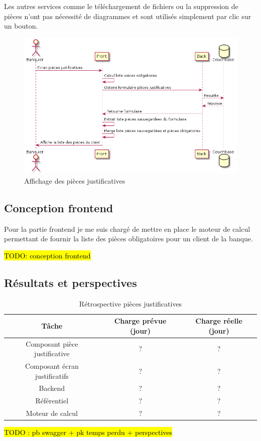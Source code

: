 	Les autres services comme le téléchargement de fichiers ou la suppression de pièces n'ont pas nécessité de diagrammes et sont utilisés simplement par clic sur un bouton. \\

\begin{figure}[h!]
	\includegraphics[scale=0.55]{images/travailBP1818/piecesJustif/seqGet.png}
	\centering
	\caption{Affichage des pièces justificatives}
	\label{seqGet}
\end{figure}

\subsection{Conception frontend}
	
	Pour la partie frontend je me suis chargé de mettre en place le moteur de calcul permettant de fournir la liste des pièces obligatoires pour un client de la banque.

\hl{TODO: conception frontend}

\subsection{Résultats et perspectives}

\begin{table}[h!]
	\center
	\begin{tabular}{| c | c | c |}
     \hline
     Tâche & Charge prévue (jour) & Charge réelle (jour) \\ \hline
     Composant pièce justificative & ? & ?\\ \hline
     Composant écran justificatifs & ? & ?\\ \hline
     Backend & ? & ?\\ \hline
     Référentiel & ? & ?\\ \hline
     Moteur de calcul & ? & ?\\
     \hline
	\end{tabular}
	\caption{Rétrospective pièces justificatives}
	\label{retroPJ}
\end{table}
	
	\hl{TODO : pb swagger + pk temps perdu + perspectives}